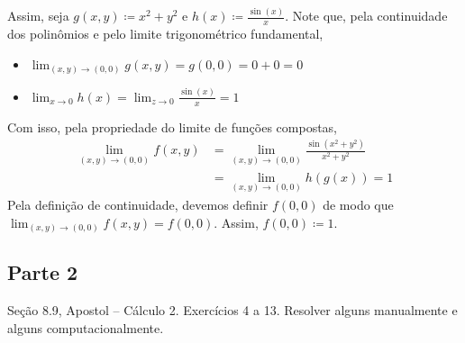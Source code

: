 \documentclass[../main.tex]{subfiles}
\begin{document}
\begin{solucao}
\begin{enumerate}[label=\alph*)]
				Assim, seja $g(x,y)\coloneq x^2+y^2$ e $h(x)\coloneq \tfrac{\sin(x)}{x}$. Note que, pela continuidade dos polinômios e pelo limite trigonométrico fundamental,
				\begin{itemize}
					\item $\lim_{(x,y)\to (0,0)} g(x,y)=g(0,0)=0+0=0$
					\item $\lim_{x\to 0} h(x)=\lim_{z\to 0} \frac{\sin(x)}{x}=1$
				\end{itemize}
				Com isso, pela propriedade do limite de funções compostas,
				\begin{align*}
					\lim_{(x,y)\to (0,0)} f(x,y)
						&=\lim_{(x,y)\to (0,0)} \tfrac{\sin(x^2+y^2)}{x^2+y^2}\\
						&=\lim_{(x,y)\to (0,0)}h(g(x))=1
				\end{align*}
				Pela definição de continuidade, devemos definir $f(0,0)$ de modo que $\lim_{(x,y)\to (0,0)}f(x,y)=f(0,0)$. Assim, $f(0,0)\coloneq 1$.
			\end{enumerate}
		\end{solucao}
		\subsection{Parte 2}
		
		\begin{exercicio}{1}
			Seção 8.9, Apostol -- Cálculo 2. Exercícios 4 a 13. Resolver alguns manualmente e alguns computacionalmente.
		\end{exercicio}
		
\end{document}
